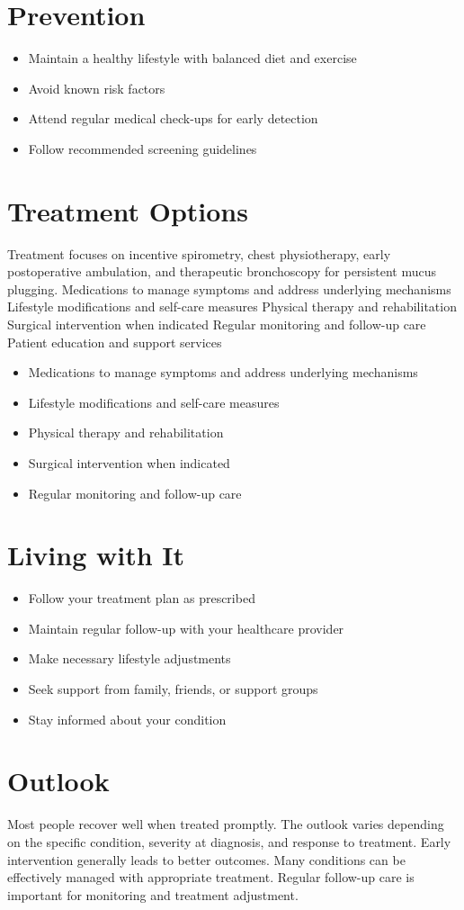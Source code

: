 \section{Prevention}
\begin{itemize}[noitemsep]
  \item Maintain a healthy lifestyle with balanced diet and exercise
  \item Avoid known risk factors
  \item Attend regular medical check-ups for early detection
  \item Follow recommended screening guidelines
\end{itemize}
\section{Treatment Options}
Treatment focuses on incentive spirometry, chest physiotherapy, early postoperative ambulation, and therapeutic bronchoscopy for persistent mucus plugging. Medications to manage symptoms and address underlying mechanisms Lifestyle modifications and self-care measures Physical therapy and rehabilitation Surgical intervention when indicated Regular monitoring and follow-up care Patient education and support services

\begin{itemize}[noitemsep]
  \item Medications to manage symptoms and address underlying mechanisms
  \item Lifestyle modifications and self-care measures
  \item Physical therapy and rehabilitation
  \item Surgical intervention when indicated
  \item Regular monitoring and follow-up care
\end{itemize}
\section{Living with It}
\begin{itemize}[noitemsep]
  \item Follow your treatment plan as prescribed
  \item Maintain regular follow-up with your healthcare provider
  \item Make necessary lifestyle adjustments
  \item Seek support from family, friends, or support groups
  \item Stay informed about your condition
\end{itemize}
\section{Outlook}
Most people recover well when treated promptly. The outlook varies depending on the specific condition, severity at diagnosis, and response to treatment. Early intervention generally leads to better outcomes. Many conditions can be effectively managed with appropriate treatment. Regular follow-up care is important for monitoring and treatment adjustment.
